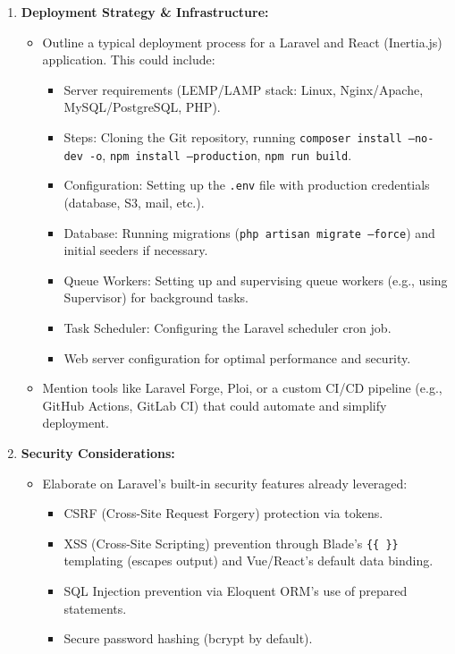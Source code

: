 \documentclass[12pt,a4paper]{article}
\begin{document}
\begin{enumerate}
    \item \textbf{Deployment Strategy \& Infrastructure:}
    \begin{itemize}
        \item Outline a typical deployment process for a Laravel and React (Inertia.js) application. This could include:
        \begin{itemize}
            \item Server requirements (LEMP/LAMP stack: Linux, Nginx/Apache, MySQL/PostgreSQL, PHP).
            \item Steps: Cloning the Git repository, running \texttt{composer install --no-dev -o}, \texttt{npm install --production}, \texttt{npm run build}.
            \item Configuration: Setting up the \texttt{.env} file with production credentials (database, S3, mail, etc.).
            \item Database: Running migrations (\texttt{php artisan migrate --force}) and initial seeders if necessary.
            \item Queue Workers: Setting up and supervising queue workers (e.g., using Supervisor) for background tasks.
            \item Task Scheduler: Configuring the Laravel scheduler cron job.
            \item Web server configuration for optimal performance and security.
        \end{itemize}
        \item Mention tools like Laravel Forge, Ploi, or a custom CI/CD pipeline (e.g., GitHub Actions, GitLab CI) that could automate and simplify deployment.
    \end{itemize}
    \item \textbf{Security Considerations:}
    \begin{itemize}
        \item Elaborate on Laravel's built-in security features already leveraged:
        \begin{itemize}
            \item CSRF (Cross-Site Request Forgery) protection via tokens.
            \item XSS (Cross-Site Scripting) prevention through Blade's \texttt{\{\{ \}\}} templating (escapes output) and Vue/React's default data binding.
            \item SQL Injection prevention via Eloquent ORM's use of prepared statements.
            \item Secure password hashing (bcrypt by default).

\end{itemize}
\end{itemize}
\end{enumerate}
\end{document}
